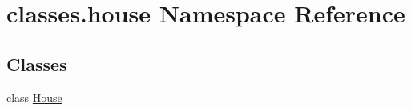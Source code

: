 \hypertarget{namespaceclasses_1_1house}{}\section{classes.\+house Namespace Reference}
\label{namespaceclasses_1_1house}
\subsection*{Classes}
\begin{DoxyCompactItemize}
\item 
class \hyperlink{classclasses_1_1house_1_1House}{House}
\end{DoxyCompactItemize}
